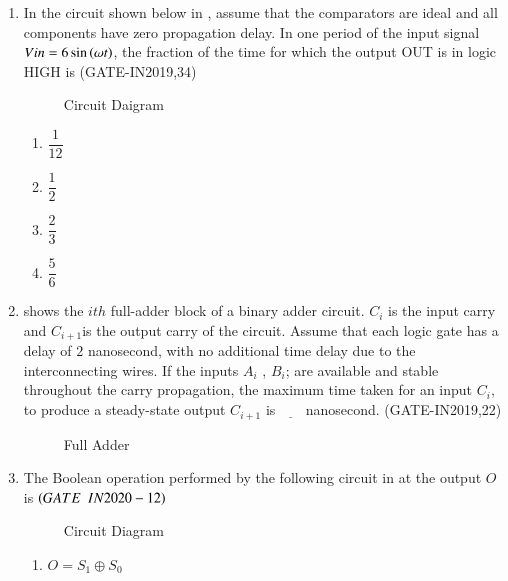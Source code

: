 \begin{enumerate}[label=\arabic*.,ref=\theenumi]
\item In the circuit shown below in 
	    ,
	 assume that the comparators are ideal and all components have zero propagation delay. In one period of the input signal $Vin=6\sin\left(\omega t\right)$, the fraction of the time for which the output OUT is in logic HIGH is 
		                 \hfill(GATE-IN2019,34)
\begin{figure}[!ht]
\centering
\resizebox{\columnwidth}{!}{%
    
	}
	    \caption{Circuit Daigram}
	    \label{fig:GATE-IN2019,34}
     \end{figure}
\begin{enumerate}
	\item $\dfrac{1}{12}$
	\item $\dfrac{1}{2}$
	\item $\dfrac{2}{3}$
	\item $\dfrac{5}{6}$
\end{enumerate}


\item 
	shows the $ith$ full-adder block of a binary adder circuit. $C_i$ is the input carry and $C_{i+1}$is the output carry of the circuit. Assume that each logic gate has a delay of $2$ nanosecond, with no additional time delay due to the interconnecting wires. If the inputs $A_i$ , $B_i$; are available and stable throughout the carry propagation, the maximum time taken for an input $C_i$, to produce a steady-state output $C_{i+1}$ is $\underline{\hspace{18pt}}$ nanosecond.
	               \hfill(GATE-IN2019,22)
\begin{figure}[!ht] 
    \centering
    \resizebox{\columnwidth}{!}{%
	
	}
	\caption{Full Adder}
	\label{fig:GATE-IN2019,22}
\end{figure}
\item The Boolean operation performed by the following  circuit 
in
	at the output $O$ is \underline{\hspace{2cm}}
    $\hfill\brak{GATE \enspace IN2020-12}$

\begin{figure}[!ht]
	\centering
	\resizebox{\columnwidth}{!}{%

	}
\caption{Circuit Diagram}
\label{fig:figure13}
\end{figure}

\begin{enumerate}

            \item  $O=S_1\oplus S_0$ 
            

\end{enumerate}
\end{enumerate}
